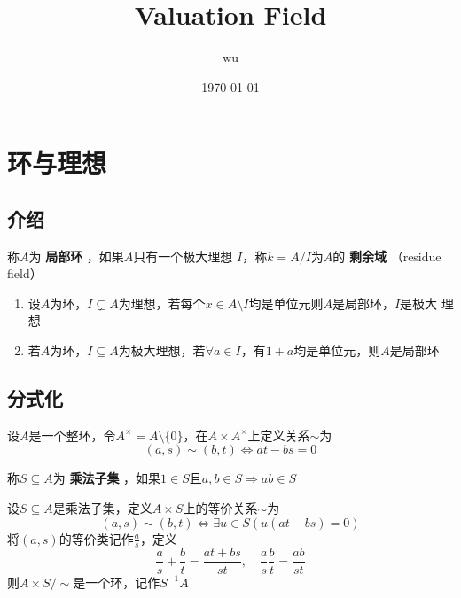 \documentclass[11pt]{article}
\author{wu}
\date{\today}
\title{Valuation Field}
\begin{document}
\maketitle
\tableofcontents

\section{环与理想}
\label{sec:org1d35c6d}
\subsection{介绍}
\label{sec:org2179b58}
\begin{definition}[]
称\(A\)为 \textbf{局部环} ，如果\(A\)只有一个极大理想 \(I\)，称\(k=A/I\)为\(A\)的 \textbf{剩余域} （residue field）
\end{definition}

\begin{proposition}[]
\begin{enumerate}
\item 设\(A\)为环，\(I\subsetneq A\)为理想，若每个\(x\in A\setminus I\)均是单位元则\(A\)是局部环，\(I\)是极大
理想
\item 若\(A\)为环，\(I\subseteq A\)为极大理想，若\(\forall a\in I\)，有\(1+a\)均是单位元，则\(A\)是局部环
\end{enumerate}
\end{proposition}


\subsection{分式化}
\label{sec:org967e449}
\begin{definition}[]
设\(A\)是一个整环，令\(A^\times=A\setminus\{0\}\)，在\(A\times A^\times\)上定义关系\(\sim\)为
\begin{equation*}
(a,s)\sim(b,t)\Leftrightarrow at-bs=0
\end{equation*}
\end{definition}

\begin{definition}[]
称\(S\subseteq A\)为 \textbf{乘法子集} ，如果\(1\in S\)且\(a,b\in S\Rightarrow ab\in S\)
\end{definition}

\begin{definition}[]
设\(S\subseteq A\)是乘法子集，定义\(A\times S\)上的等价关系\(\sim\)为
\begin{equation*}
(a,s)\sim(b,t)\Leftrightarrow\exists u\in S(u(at-bs)=0)
\end{equation*}
将\((a,s)\)的等价类记作\(\frac{a}{s}\)，定义
\begin{equation*}
\frac{a}{s}+\frac{b}{t}=\frac{at+bs}{st},\quad\frac{a}{s}\frac{b}{t}=\frac{ab}{st}
\end{equation*}
则\(A\times S/\sim\)是一个环，记作\(S^{-1}A\)
\end{definition}
\end{document}
